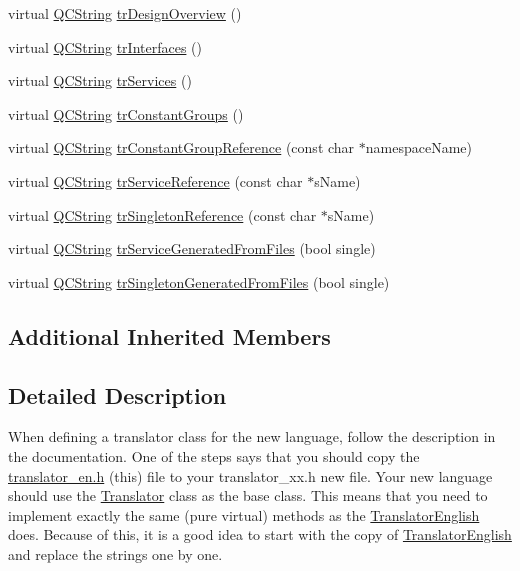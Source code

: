 \begin{DoxyCompactItemize}
\item 
virtual \mbox{\hyperlink{class_q_c_string}{Q\+C\+String}} \mbox{\hyperlink{class_translator_hungarian_a164b311177a8a5b7d718c8cb0a7cd8c8}{tr\+Design\+Overview}} ()
\item 
virtual \mbox{\hyperlink{class_q_c_string}{Q\+C\+String}} \mbox{\hyperlink{class_translator_hungarian_aa9b8066f27b8cbec0b55e9c82da74d44}{tr\+Interfaces}} ()
\item 
virtual \mbox{\hyperlink{class_q_c_string}{Q\+C\+String}} \mbox{\hyperlink{class_translator_hungarian_aba7f5edf9dfe0f93a1f7e5eed9ea6e6c}{tr\+Services}} ()
\item 
virtual \mbox{\hyperlink{class_q_c_string}{Q\+C\+String}} \mbox{\hyperlink{class_translator_hungarian_a2e83cab89caebec82a9e03940421b407}{tr\+Constant\+Groups}} ()
\item 
virtual \mbox{\hyperlink{class_q_c_string}{Q\+C\+String}} \mbox{\hyperlink{class_translator_hungarian_af8b59f35e7b87b0ca62d9f3e6e54946e}{tr\+Constant\+Group\+Reference}} (const char $\ast$namespace\+Name)
\item 
virtual \mbox{\hyperlink{class_q_c_string}{Q\+C\+String}} \mbox{\hyperlink{class_translator_hungarian_ab93c511fe06b5f76551d9faeae242d7d}{tr\+Service\+Reference}} (const char $\ast$s\+Name)
\item 
virtual \mbox{\hyperlink{class_q_c_string}{Q\+C\+String}} \mbox{\hyperlink{class_translator_hungarian_ab4473983ec1cecc514f01e11709d1d7d}{tr\+Singleton\+Reference}} (const char $\ast$s\+Name)
\item 
virtual \mbox{\hyperlink{class_q_c_string}{Q\+C\+String}} \mbox{\hyperlink{class_translator_hungarian_a3f491ed6719982e1e8682c23097d1527}{tr\+Service\+Generated\+From\+Files}} (bool single)
\item 
virtual \mbox{\hyperlink{class_q_c_string}{Q\+C\+String}} \mbox{\hyperlink{class_translator_hungarian_a96a434b0917ffafd489644847a2810ae}{tr\+Singleton\+Generated\+From\+Files}} (bool single)
\end{DoxyCompactItemize}
\subsection*{Additional Inherited Members}


\subsection{Detailed Description}
When defining a translator class for the new language, follow the description in the documentation. One of the steps says that you should copy the \mbox{\hyperlink{translator__en_8h_source}{translator\+\_\+en.\+h}} (this) file to your translator\+\_\+xx.\+h new file. Your new language should use the \mbox{\hyperlink{class_translator}{Translator}} class as the base class. This means that you need to implement exactly the same (pure virtual) methods as the \mbox{\hyperlink{class_translator_english}{Translator\+English}} does. Because of this, it is a good idea to start with the copy of \mbox{\hyperlink{class_translator_english}{Translator\+English}} and replace the strings one by one.

